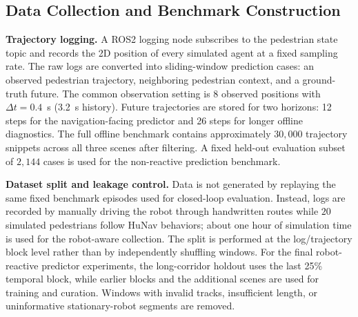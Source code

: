 \documentclass[12pt, a4paper]{article}
\begin{document}
\subsection{Data Collection and Benchmark Construction}

\textbf{Trajectory logging.} A ROS2 logging node subscribes to the pedestrian state topic and records the 2D position of every simulated agent at a fixed sampling rate. The raw logs are converted into sliding-window prediction cases: an observed pedestrian trajectory, neighboring pedestrian context, and a ground-truth future. The common observation setting is $8$ observed positions with $\Delta t=0.4$~s (3.2~s history). Future trajectories are stored for two horizons: 12 steps for the navigation-facing predictor and 26 steps for longer offline diagnostics. The full offline benchmark contains approximately $30{,}000$ trajectory snippets across all three scenes after filtering. A fixed held-out evaluation subset of $2{,}144$ cases is used for the non-reactive prediction benchmark.

\textbf{Dataset split and leakage control.} Data is not generated by replaying the same fixed benchmark episodes used for closed-loop evaluation. Instead, logs are recorded by manually driving the robot through handwritten routes while $20$ simulated pedestrians follow HuNav behaviors; about one hour of simulation time is used for the robot-aware collection. The split is performed at the log/trajectory block level rather than by independently shuffling windows. For the final robot-reactive predictor experiments, the long-corridor holdout uses the last 25\% temporal block, while earlier blocks and the additional scenes are used for training and curation. Windows with invalid tracks, insufficient length, or uninformative stationary-robot segments are removed.
\end{document}
